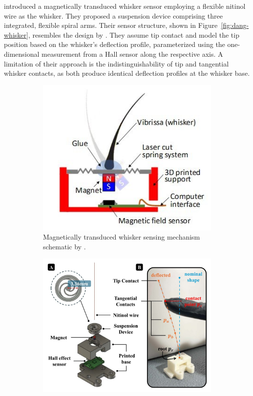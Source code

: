 \textcite{dang2025whisker} introduced a magnetically transduced whisker sensor employing a flexible nitinol wire as the whisker.
They proposed a suspension device comprising three integrated, flexible spiral arms.
Their sensor structure, shown in Figure~\ref{fig:dang-whisker}, resembles the design by \citeauthor{8968518}.
They assume tip contact and model the tip position based on the whisker's deflection profile, parameterized using the one-dimensional measurement from a Hall sensor along the respective axis.
A limitation of their approach is the indistinguishability of tip and tangential whisker contacts, as both produce identical deflection profiles at the whisker base.

\begin{figure}[htb]
    \centering
    \begin{subfigure}{0.48\textwidth}
        \centering
        \includegraphics[width=\textwidth]{figures/kim-velez-whisker}
        \caption{Magnetically transduced whisker sensing mechanism schematic by \textcite{8968518}.}
        \label{fig:kim-whisker}
    \end{subfigure}\hfill
    \begin{subfigure}{0.48\textwidth}
        \centering
        \includegraphics[width=\textwidth]{figures/dang-whisker}

\end{subfigure}
\end{figure}
